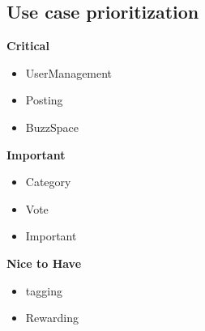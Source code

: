 \documentclass[a4paper,12pt]{report}
\begin{document}
\subsection{Use case prioritization}

\textbf{Critical}
\begin{itemize}
	\item UserManagement
	\item Posting
	\item BuzzSpace
\end{itemize}

\textbf{Important}
\begin{itemize}
	\item Category
	\item Vote
	\item Important
\end{itemize}

\textbf{Nice to Have}
\begin{itemize}
	\item tagging
	\item Rewarding
\end{itemize}
\end{document}
